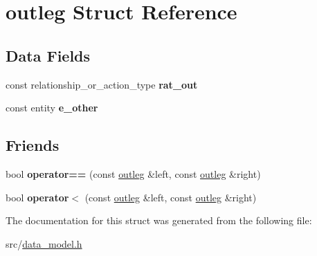 \hypertarget{structoutleg}{}\section{outleg Struct Reference}
\label{structoutleg}
\subsection*{Data Fields}
\begin{DoxyCompactItemize}
\item 
\mbox{\label{structoutleg_ac6f31d14238aca57d09ddaf94cef3b68}} 
const relationship\+\_\+or\+\_\+action\+\_\+type {\bfseries rat\+\_\+out}
\item 
\mbox{\label{structoutleg_a6c75c8d4acf98324c5c4b426f9dbb664}} 
const entity {\bfseries e\+\_\+other}
\end{DoxyCompactItemize}
\subsection*{Friends}
\begin{DoxyCompactItemize}
\item 
\mbox{\label{structoutleg_a925572d2a4bc56d312134f995f7790a5}} 
bool {\bfseries operator==} (const \hyperlink{structoutleg}{outleg} \&left, const \hyperlink{structoutleg}{outleg} \&right)
\item 
\mbox{\label{structoutleg_a594b6be76b1271da95305f64d3f28f52}} 
bool {\bfseries operator$<$} (const \hyperlink{structoutleg}{outleg} \&left, const \hyperlink{structoutleg}{outleg} \&right)
\end{DoxyCompactItemize}


The documentation for this struct was generated from the following file\+:\begin{DoxyCompactItemize}
\item 
src/\hyperlink{data__model_8h}{data\+\_\+model.\+h}\end{DoxyCompactItemize}
